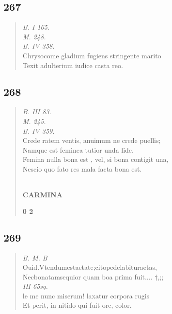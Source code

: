 \documentclass[11pt, a4paper]{report}
\begin{document}
            \subsection*{267}
      \begin{verse}
      \textit{B. I 165.} \\ \textit{M. 248.} \\ \textit{B. IV 358.} \\ Chrysocome gladium fugiens stringente marito \\ Texit adulterium iudice casta reo. \\ 
      \end{verse}
  
            \subsection*{268}
      \begin{verse}
      \textit{B. III 83.} \\ \textit{M. 245.} \\ \textit{B. IV 359.} \\ Crede ratem ventis, anuimum ne crede puellis; \\ Namque est feminea tutior unda lide. \\ Femina nulla bona  \lbrack est \rbrack , vel, si bona contigit una, \\ Nescio quo fato res mala facta bona est. \\ 
        ﻿\pagebreak 
    \begin{center} \textbf{CARMINA} \end{center}\begin{center} \textbf{0 2} \end{center}
      \end{verse}
  
            \subsection*{269}
      \begin{verse}
      \textit{B. M. B} \\ Ouid.Vtendumestaetate;citopedelabituraetas, \\ Necbonatamsequior quam boa prima fuit.... †,;; \\ \textit{III 65sq.} \\ le me nunc miserum! laxatur corpora rugis \\ Et perit, in nitido qui fuit ore, color. \\ 
      \end{verse}
  
\end{document}
